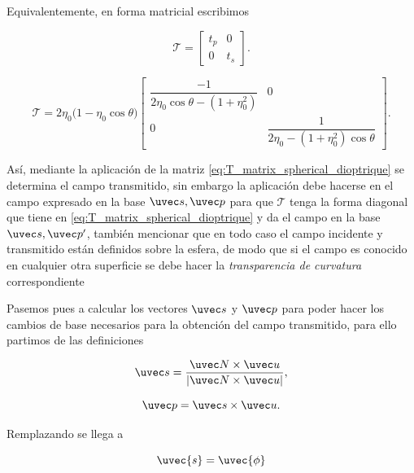 Equivalentemente, en forma matricial escribimos


\begin{equation}
    \mathcal T = \begin{bmatrix}
                t_p & 0 \\
                0 & t_s 
            \end{bmatrix}.
    \label{eq:T_matrix_def}
\end{equation}

\begin{equation}
    \mathcal{T}
    = 2\eta_0 \bigl(1 - \eta_0 \cos\theta\bigr)
    \begin{bmatrix}
    \dfrac{-1}{2\eta_0\cos\theta - (1 + \eta_0^2)} & 0 \\
    0 & \dfrac{1}{2\eta_0 - (1+\eta_0^2)\cos\theta}
    \end{bmatrix}.
    \label{eq:T_matrix_spherical_dioptrique}
\end{equation}

Así, mediante la aplicación de la matriz \ref{eq:T_matrix_spherical_dioptrique} se determina el campo transmitido, sin embargo la aplicación debe hacerse en el campo expresado en la base $\uvec s, \uvec p$ para que $\mathcal T$ tenga la forma diagonal que tiene en \ref{eq:T_matrix_spherical_dioptrique} y da el campo en la base $\uvec s, \uvec p'$, también mencionar que en todo caso el campo incidente y transmitido están definidos sobre la esfera, de modo que si el campo es conocido en cualquier otra superficie se debe hacer la \emph{transparencia de curvatura} correspondiente



Pasemos pues a calcular los vectores $\uvec s$ y $\uvec p$ para poder hacer los cambios de base necesarios para la obtención del campo transmitido, para ello partimos de las definiciones 

\begin{equation}
    \uvec s = \frac{\uvec N \times \uvec u}{\lvert  \uvec N \times \uvec u \rvert},
    \label{eq:s_hat_def}
\end{equation}


\begin{equation}
    \uvec p = \uvec s \times \uvec u   
    \label{eq:p_hat_def}.
\end{equation}

Remplazando se llega a 


\begin{equation}
    \uvec{s} = \uvec{\phi}  
    \label{eq:s_mode}
\end{equation}

